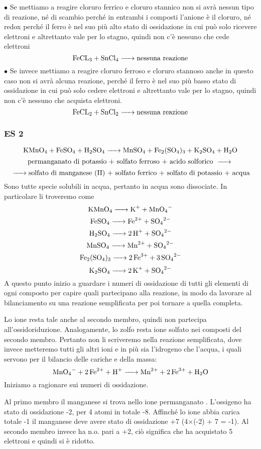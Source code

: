$\bullet$ Se mettiamo a reagire cloruro ferrico  e cloruro stannico  non si avrà nessun tipo di reazione, né di scambio perché in entrambi i composti l'anione è il cloruro, né redox perché il ferro è nel suo più alto stato di ossidazione in cui può solo ricevere elettroni e altrettanto vale per lo stagno, quindi non c'è nessuno che cede elettroni
$$\ce{FeCL_3 +  SnCl_4 ->}\text{nessuna reazione}$$
$\bullet$ Se invece mettiamo a reagire cloruro ferroso  e cloruro stannoso  anche in questo caso non si avrà alcuna reazione, perché il ferro è nel suo più basso stato di ossidazione in cui può solo cedere elettroni e altrettanto vale per lo stagno, quindi non c'è nessuno che acquista elettroni.
$$\ce{FeCL_2 + SnCl_2 ->}\text{nessuna reazione}$$
\subsubsection{\textbf{ES 2}}
$$\ce{KMnO_4 + FeSO_4 + H_2SO_4 -> MnSO_4 + Fe_2(SO_4)_3 + K_2SO_4 + H_2O}$$
$$\text{permanganato di potassio + solfato ferroso + acido solforico \ce{->}}$$
$$\ce{->}\text{solfato di manganese (II) + solfato ferrico + solfato di potassio + acqua}$$
Sono tutte specie solubili in acqua, pertanto in acqua sono dissociate. In particolare li troveremo come
$$\ce{KMnO_4 -> K^+ + MnO_4^-}$$
$$\ce{FeSO_4 -> Fe^{2+} + SO_4^{2-}}$$
$$\ce{H_2SO_4 -> 2 H^+ + SO_4^{2-}}$$
$$\ce{MnSO_4 -> Mn^{2+} + SO_4^{2-}}$$
$$\ce{Fe_2(SO_4)_3 -> 2 Fe^{3+} + 3 SO_4^{2-}}$$
$$\ce{K_2SO_4 -> 2 K^+ + SO_4^{2-}}$$
A questo punto inizio a guardare i numeri di ossidazione di tutti gli elementi di ogni composto per capire quali partecipano alla reazione, in modo da lavorare al bilanciamento su una reazione semplificata per poi tornare a quella completa.

Lo ione  resta tale anche al secondo membro, quindi non partecipa all'ossidoriduzione. Analogamente, lo zolfo resta ione solfato  nei composti del secondo membro. Pertanto non li scriveremo nella reazione semplificata, dove invece metteremo tutti gli altri ioni e in più sia l'idrogeno  che l'acqua, i quali servono per il bilancio delle cariche e della massa:
$$\ce{MnO_4- + 2Fe^2+ + H+ -> Mn^2+ + 2Fe^3+ + H_2O}$$
Iniziamo a ragionare sui numeri di ossidazione.

Al primo membro il manganese si trova nello ione permanganato . L'ossigeno ha stato di ossidazione -2, per 4 atomi in totale -8. Affinché lo ione abbia carica totale -1 il manganese deve avere stato di ossidazione +7 (4$\times$(-2) + 7 = -1). Al secondo membro invece ha n.o. pari a +2, ciò significa che ha acquistato 5 elettroni e quindi si è ridotto.

